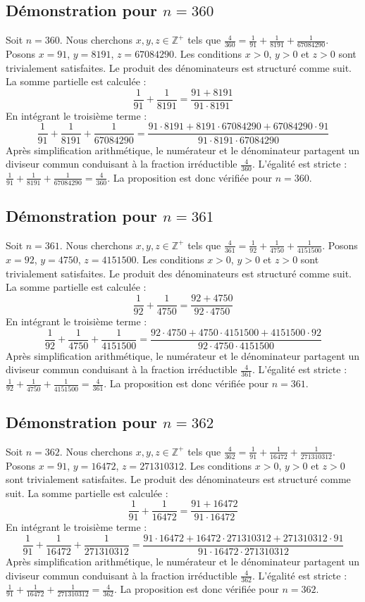 \documentclass[11pt,a4paper]{article}
\begin{document}
\subsection{Démonstration pour $n = 360$}
Soit $n = 360$. Nous cherchons $x, y, z \in \mathbb{Z}^{+}$ tels que $\frac{4}{360} = \frac{1}{91} + \frac{1}{8191} + \frac{1}{67084290}$.
Posons $x = 91$, $y = 8191$, $z = 67084290$.
Les conditions $x > 0$, $y > 0$ et $z > 0$ sont trivialement satisfaites.
Le produit des dénominateurs est structuré comme suit. La somme partielle est calculée :
$$ \frac{1}{91} + \frac{1}{8191} = \frac{91+8191}{91 \cdot 8191} $$
En intégrant le troisième terme :
$$ \frac{1}{91} + \frac{1}{8191} + \frac{1}{67084290} = \frac{91 \cdot 8191 + 8191 \cdot 67084290 + 67084290 \cdot 91}{91 \cdot 8191 \cdot 67084290} $$
Après simplification arithmétique, le numérateur et le dénominateur partagent un diviseur commun conduisant à la fraction irréductible $\frac{4}{360}$.
L'égalité est stricte : $\frac{1}{91} + \frac{1}{8191} + \frac{1}{67084290} = \frac{4}{360}$.
La proposition est donc vérifiée pour $n = 360$.
\subsection{Démonstration pour $n = 361$}
Soit $n = 361$. Nous cherchons $x, y, z \in \mathbb{Z}^{+}$ tels que $\frac{4}{361} = \frac{1}{92} + \frac{1}{4750} + \frac{1}{4151500}$.
Posons $x = 92$, $y = 4750$, $z = 4151500$.
Les conditions $x > 0$, $y > 0$ et $z > 0$ sont trivialement satisfaites.
Le produit des dénominateurs est structuré comme suit. La somme partielle est calculée :
$$ \frac{1}{92} + \frac{1}{4750} = \frac{92+4750}{92 \cdot 4750} $$
En intégrant le troisième terme :
$$ \frac{1}{92} + \frac{1}{4750} + \frac{1}{4151500} = \frac{92 \cdot 4750 + 4750 \cdot 4151500 + 4151500 \cdot 92}{92 \cdot 4750 \cdot 4151500} $$
Après simplification arithmétique, le numérateur et le dénominateur partagent un diviseur commun conduisant à la fraction irréductible $\frac{4}{361}$.
L'égalité est stricte : $\frac{1}{92} + \frac{1}{4750} + \frac{1}{4151500} = \frac{4}{361}$.
La proposition est donc vérifiée pour $n = 361$.
\subsection{Démonstration pour $n = 362$}
Soit $n = 362$. Nous cherchons $x, y, z \in \mathbb{Z}^{+}$ tels que $\frac{4}{362} = \frac{1}{91} + \frac{1}{16472} + \frac{1}{271310312}$.
Posons $x = 91$, $y = 16472$, $z = 271310312$.
Les conditions $x > 0$, $y > 0$ et $z > 0$ sont trivialement satisfaites.
Le produit des dénominateurs est structuré comme suit. La somme partielle est calculée :
$$ \frac{1}{91} + \frac{1}{16472} = \frac{91+16472}{91 \cdot 16472} $$
En intégrant le troisième terme :
$$ \frac{1}{91} + \frac{1}{16472} + \frac{1}{271310312} = \frac{91 \cdot 16472 + 16472 \cdot 271310312 + 271310312 \cdot 91}{91 \cdot 16472 \cdot 271310312} $$
Après simplification arithmétique, le numérateur et le dénominateur partagent un diviseur commun conduisant à la fraction irréductible $\frac{4}{362}$.
L'égalité est stricte : $\frac{1}{91} + \frac{1}{16472} + \frac{1}{271310312} = \frac{4}{362}$.
La proposition est donc vérifiée pour $n = 362$.
\end{document}
